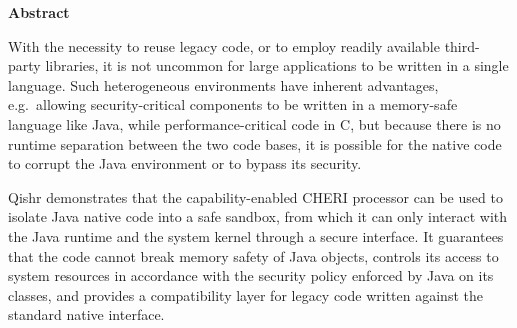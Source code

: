 \newpage
{\Huge \bf Abstract}
\vspace{24pt} 

With the necessity to reuse legacy code, or to employ readily available third-party libraries, it is not uncommon for large applications to be written in a single language. Such heterogeneous environments have inherent advantages, e.g.\ allowing security-critical components to be written in a memory-safe language like Java, while performance-critical code in C, but because there is no runtime separation between the two code bases, it is possible for the native code to corrupt the Java environment or to bypass its security.

Qishr demonstrates that the capability-enabled CHERI processor can be used to isolate Java native code into a safe sandbox, from which it can only interact with the Java runtime and the system kernel through a secure interface. It guarantees that the code cannot break memory safety of Java objects, controls its access to system resources in accordance with the security policy enforced by Java on its classes, and provides a compatibility layer for legacy code written against the standard native interface.

\newpage
\vspace*{\fill}
